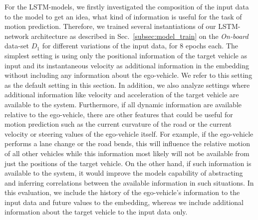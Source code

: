 For the \ac{LSTM}-models, we firstly investigated the composition of the input data to the model to get an idea, what kind of information is useful for the task of motion prediction.
Therefore, we trained several instantiations of our \ac{LSTM}-network architecture as described in Sec.~\ref{subsec:model_train} on the \emph{On-board} data-set $D_1$ for different variations of the input data, for \num{8} epochs each.
The simplest setting is using only the positional information of the target vehicle as input and its instantaneous velocity as additional information in the embedding without including any information about the ego-vehicle.
We refer to this setting as the default setting in this section.
In addition, we also analyze settings where additional information like velocity and acceleration of the target vehicle are available to the system.
Furthermore, if all dynamic information are available relative to the ego-vehicle, there are other features that could be useful for motion prediction such as the current curvature of the road or the current velocity or steering values of the ego-vehicle itself.
For example, if the ego-vehicle performs a lane change or the road bends, this will influence the relative motion of all other vehicles while this information most likely will not be available from just the positions of the target vehicle. 
On the other hand, if such information is available to the system, it would improve the models capability of abstracting and inferring correlations between the available information in such situations.
In this evaluation, we include the history of the ego-vehicle's information to the input data and future values to the embedding, whereas we include additional information about the target vehicle to the input data only. 

